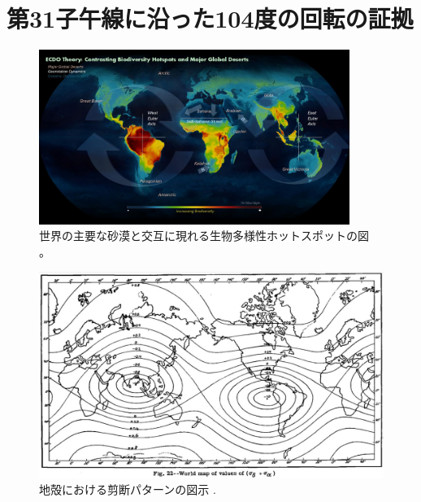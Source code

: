 \documentclass[10pt,twocolumn,letterpaper]{article}
\begin{document}


\section{第31子午線に沿った104度の回転の証拠}

\begin{figure}[t]
\begin{center}
\includegraphics[width=0.9\textwidth]{biodiversity.jpg}
\end{center}
   \caption{世界の主要な砂漠と交互に現れる生物多様性ホットスポットの図 \cite{28}。}
\label{fig:9}
\end{figure}

\begin{figure}[t]
\begin{center}
   \includegraphics[width=1\linewidth]{meinesz3.jpg}
\end{center}
   \caption{地殻における剪断パターンの図示 \cite{36}.}
\label{fig:8}

\label{fig:onecol}
\end{figure}
\end{document}
